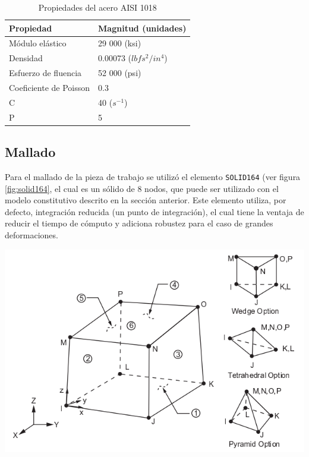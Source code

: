 
\begin{table}[h]
\centering
\caption{Propiedades del acero AISI 1018}
\label{}
\begin{tabular}{p{4cm} p{4cm}} \hline
Propiedad & Magnitud (unidades) \\
\hline
Módulo elástico & 29 000 (ksi) \\
Densidad & 0.00073 ($lbf s^2/in^4$) \\
Esfuerzo de fluencia & 52 000 (psi) \\
Coeficiente de Poisson & 0.3 \\
C & 40 ($s^{-1}$) \\
P & 5 \\
\hline
\end{tabular}
\label{tab:material_properties}
\end{table}


\subsection{Mallado}

Para el mallado de la pieza de trabajo se utilizó el elemento \texttt{SOLID164} 
(ver figura \ref{fig:solid164}, el cual es un sólido de 8 nodos, que puede ser utilizado con el modelo 
constitutivo descrito en la sección anterior. Este elemento utiliza, por defecto, integración reducida 
(un punto de integración), el cual tiene la ventaja de reducir el tiempo de cómputo y adiciona 
robustez para el caso de grandes deformaciones. ~\cite{lsdyna-ansys-manual}

\begin{center}
\includegraphics[scale=0.65]{src/ch3/solid164.png}
\label{fig:solid164}
\end{center}

